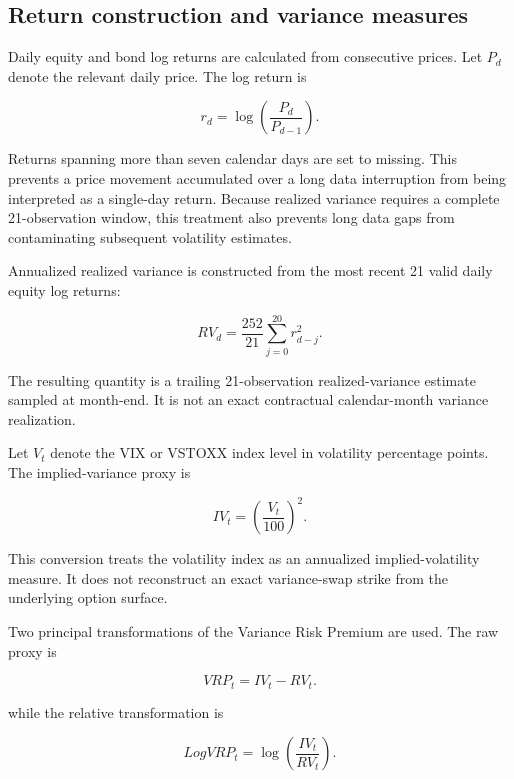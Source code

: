 \subsection{Return construction and variance measures}

Daily equity and bond log returns are calculated from consecutive prices. Let $P_d$ denote the relevant daily price. The log return is

\begin{equation}
r_d
=
\log
\left(
\frac{P_d}{P_{d-1}}
\right).
\end{equation}

Returns spanning more than seven calendar days are set to missing. This prevents a price movement accumulated over a long data interruption from being interpreted as a single-day return. Because realized variance requires a complete 21-observation window, this treatment also prevents long data gaps from contaminating subsequent volatility estimates.

Annualized realized variance is constructed from the most recent 21 valid daily equity log returns:

\begin{equation}
RV_d
=
\frac{252}{21}
\sum_{j=0}^{20}
r_{d-j}^{2}.
\end{equation}

The resulting quantity is a trailing 21-observation realized-variance estimate sampled at month-end. It is not an exact contractual calendar-month variance realization.

Let $V_t$ denote the VIX or VSTOXX index level in volatility percentage points. The implied-variance proxy is

\begin{equation}
IV_t
=
\left(
\frac{V_t}{100}
\right)^2.
\end{equation}

This conversion treats the volatility index as an annualized implied-volatility measure. It does not reconstruct an exact variance-swap strike from the underlying option surface.

Two principal transformations of the Variance Risk Premium are used. The raw proxy is

\begin{equation}
VRP_t
=
IV_t
-
RV_t.
\end{equation}

while the relative transformation is

\begin{equation}
LogVRP_t
=
\log
\left(
\frac{IV_t}{RV_t}
\right).
\end{equation}

